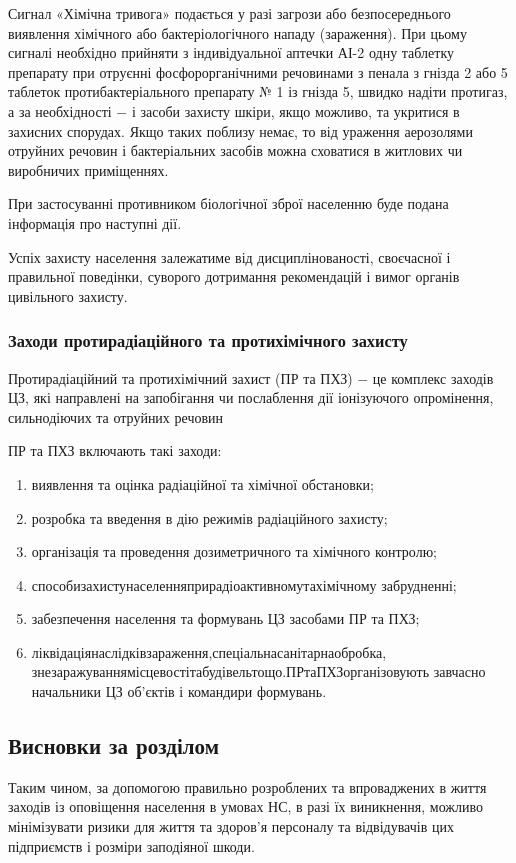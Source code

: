 Сигнал «Хімічна тривога» подається у разі загрози або безпосереднього виявлення хімічного або бактеріологічного нападу (зараження). При цьому сигналі необхідно прийняти з індивідуальної аптечки АІ-2 одну таблетку препарату при отруєнні фосфорорганічними речовинами з пенала з гнізда 2 або 5 таблеток протибактеріального препарату № 1 із гнізда 5, швидко надіти протигаз, а за необхідності $-$ і засоби захисту шкіри, якщо можливо, та укритися в захисних спорудах. Якщо таких поблизу немає, то від ураження аерозолями отруйних речовин і бактеріальних засобів можна сховатися в житлових чи виробничих приміщеннях.

При застосуванні противником біологічної зброї населенню буде подана інформація про наступні дії.

Успіх захисту населення залежатиме від дисциплінованості, своєчасної і правильної поведінки, суворого дотримання рекомендацій і вимог органів цивільного захисту.

\subsubsection{Заходи протирадіаційного та протихімічного захисту}

Протирадіаційний та протихімічний захист (ПР та ПХЗ) $-$ це комплекс заходів ЦЗ, які направлені на запобігання чи послаблення дії іонізуючого опромінення, сильнодіючих та отруйних речовин

ПР та ПХЗ включають такі заходи:

\begin{enumerate}
	\item виявлення та оцінка радіаційної та хімічної обстановки;
	\item розробка та введення в дію режимів радіаційного захисту;
	\item організація та проведення дозиметричного та хімічного контролю;
	\item способи\hfill захисту\hfill населення\hfill при\hfill радіоактивному\hfill та\hfill хімічному\newline \hspace*{-20mm} забрудненні;
	\item забезпечення населення та формувань ЦЗ засобами ПР та ПХЗ;
	\item ліквідація\hfill наслідків\hfill зараження,\hfill спеціальна\hfill санітарна\hfill обробка,\newline \hspace*{-20mm} знезаражування\hfill місцевості\hfill та\hfill будівель\hfill тощо.\hfill ПР\hfill та\hfill ПХЗ\hfill організовують\newline \hspace*{-20mm} завчасно начальники ЦЗ об’єктів і командири формувань.
\end{enumerate}

\subsection{Висновки за розділом}

Таким чином, за допомогою правильно розроблених та впроваджених в життя заходів із оповіщення населення в умовах НС, в разі їх виникнення, можливо мінімізувати ризики для життя та здоров’я персоналу та відвідувачів цих підприємств і розміри заподіяної шкоди. 

